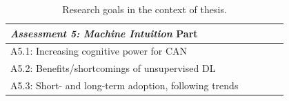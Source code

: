 \begin{table}[!h]
\begin{tabular}{p{0.8\linewidth}}
					\textit{Assessment 5: Machine Intuition} \hfill Part \RomanNumeralCaps{5}\\
					\hline
					\hspace{4pt} A5.1: Increasing cognitive power for CAN \\
					\hspace{4pt} A5.2: Benefits/shortcomings of unsupervised DL \\
					\hspace{4pt} A5.3: Short- and long-term adoption, following trends \\						
				\end{tabular}
				\caption[Research goals]{Research goals in the context of thesis.}
				\label{tab:res_objs}
			\end{table}				
			
%
%				
%								
%			
		

